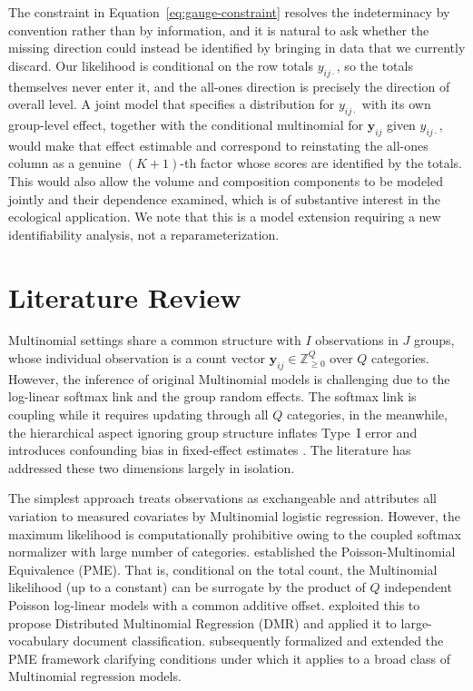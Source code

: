 The constraint in Equation~\eqref{eq:gauge-constraint} resolves the indeterminacy by convention rather than by information, and it is natural to ask whether the missing direction could instead be identified by bringing in data that we currently discard. Our likelihood is conditional on the row totals $y_{ij\cdot}$, so the totals themselves never enter it, and the all-ones direction is precisely the direction of overall level. A joint model that specifies a distribution for $y_{ij\cdot}$ with its own group-level effect, together with the conditional multinomial for $\bm{y}_{ij}$ given $y_{ij\cdot}$, would make that effect estimable and correspond to reinstating the all-ones column as a genuine $(K{+}1)$-th factor whose scores are identified by the totals. This would also allow the volume and composition components to be modeled jointly and their dependence examined, which is of substantive interest in the ecological application. We note that this is a model extension requiring a new identifiability analysis, not a reparameterization.

\section{Literature Review}
\label{sec:literature-review}

Multinomial settings share a common structure with $I$ observations in $J$ groups, whose individual observation is a count vector $\bm{y}_{ij} \in \mathbb{Z}^Q_{\geq 0}$ over $Q$ categories. However, the inference of original Multinomial models is challenging due to the log-linear softmax link and the group random effects. The softmax link is coupling while it requires updating through all $Q$ categories, in the meanwhile, the hierarchical aspect ignoring group structure inflates Type~I error and introduces confounding bias in fixed-effect estimates \citep{Lee2019}. The literature has addressed these two dimensions largely in isolation. 

The simplest approach treats observations as exchangeable and attributes all variation to measured covariates by Multinomial logistic regression. However, the maximum likelihood is computationally prohibitive owing to the coupled softmax normalizer with large number of categories. \citet{Baker1994} established the Poisson-Multinomial Equivalence (PME). That is, conditional on the total count, the Multinomial likelihood (up to a constant) can be surrogate by the product of $Q$ independent Poisson log-linear models with a common additive offset. \citet{Taddy2015} exploited this to propose Distributed Multinomial Regression (DMR) and applied it to large-vocabulary document classification. \citet{Lee2017} subsequently formalized and extended the PME framework clarifying conditions under which it applies to a broad class of Multinomial regression models.
 
